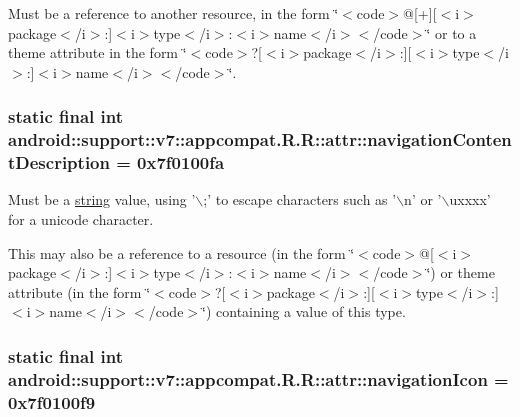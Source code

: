 Must be a reference to another resource, in the form \char`\"{}$<$code$>$@\mbox{[}+\mbox{]}\mbox{[}$<$i$>$package$<$/i$>$:\mbox{]}$<$i$>$type$<$/i$>$:$<$i$>$name$<$/i$>$$<$/code$>$\char`\"{} or to a theme attribute in the form \char`\"{}$<$code$>$?\mbox{[}$<$i$>$package$<$/i$>$:\mbox{]}\mbox{[}$<$i$>$type$<$/i$>$:\mbox{]}$<$i$>$name$<$/i$>$$<$/code$>$\char`\"{}. \hypertarget{classandroid_1_1support_1_1v7_1_1appcompat_1_1_r_1_1attr_44e9c28737d0a34e69caa628a752eef0}{
\subsubsection[{navigationContentDescription}]{\setlength{\rightskip}{0pt plus 5cm}static final int android::support::v7::appcompat.R.R::attr::navigationContentDescription = 0x7f0100fa}}
\label{classandroid_1_1support_1_1v7_1_1appcompat_1_1_r_1_1attr_44e9c28737d0a34e69caa628a752eef0}


Must be a \hyperlink{classandroid_1_1support_1_1v7_1_1appcompat_1_1_r_1_1string}{string} value, using '$\backslash$;' to escape characters such as '$\backslash$n' or '$\backslash$uxxxx' for a unicode character. 

This may also be a reference to a resource (in the form \char`\"{}$<$code$>$@\mbox{[}$<$i$>$package$<$/i$>$:\mbox{]}$<$i$>$type$<$/i$>$:$<$i$>$name$<$/i$>$$<$/code$>$\char`\"{}) or theme attribute (in the form \char`\"{}$<$code$>$?\mbox{[}$<$i$>$package$<$/i$>$:\mbox{]}\mbox{[}$<$i$>$type$<$/i$>$:\mbox{]}$<$i$>$name$<$/i$>$$<$/code$>$\char`\"{}) containing a value of this type. \hypertarget{classandroid_1_1support_1_1v7_1_1appcompat_1_1_r_1_1attr_502fb9e46161a601206d48128eada6d5}{
\subsubsection[{navigationIcon}]{\setlength{\rightskip}{0pt plus 5cm}static final int android::support::v7::appcompat.R.R::attr::navigationIcon = 0x7f0100f9}}
\label{classandroid_1_1support_1_1v7_1_1appcompat_1_1_r_1_1attr_502fb9e46161a601206d48128eada6d5}


